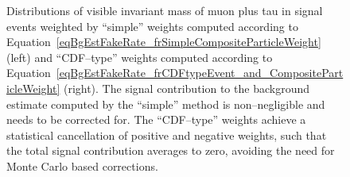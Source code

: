 \begin{figure}[t]
\begin{center}
\caption[Comparison of fake--rate contribution from genuine taus in the simple
and CDF methods]{\captiontext Distributions of visible invariant mass of muon
plus tau in \ZTT signal events weighted by ``simple'' weights computed
according to Equation~\ref{eqBgEstFakeRate_frSimpleCompositeParticleWeight}
(left) and ``CDF--type'' weights computed according to
Equation~\ref{eqBgEstFakeRate_frCDFtypeEvent_and_CompositeParticleWeight}
(right).  The signal contribution to the background estimate computed by the
``simple'' method is non--negligible and needs to be corrected for.  The
``CDF--type'' weights achieve a statistical cancellation of positive and
negative weights, such that the total signal contribution averages to zero,
avoiding the need for Monte Carlo based corrections.}
\label{figBgEstFakeRate_frCDFtypeResults_mVisibleSignal}
\end{center}
\end{figure} 

